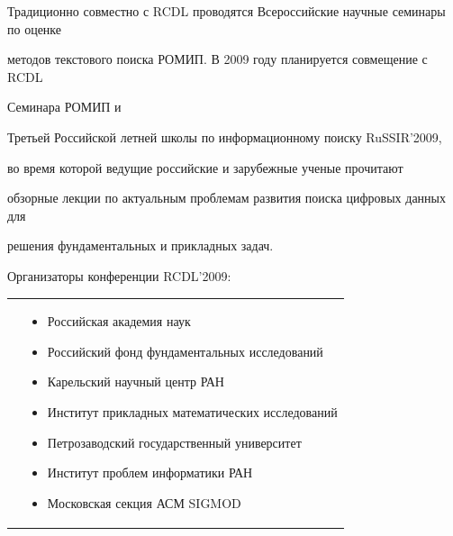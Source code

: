 \documentclass[10pt]{book}
\begin{document}
Традиционно совместно с RCDL проводятся Всероссийские научные семинары по оценке


методов текстового поиска РОМИП. В 2009 году планируется совмещение с RCDL


Семинара РОМИП и\linebreak


 Третьей Российской летней школы по информационному поиску RuSSIR'2009,


во время которой ведущие российские и зарубежные ученые прочитают


обзорные лекции по актуальным проблемам развития поиска цифровых данных для


решения фундаментальных и прикладных задач.


\vspace*{6pt}





Организаторы конференции RCDL'2009:


\vspace*{-6pt}





\noindent


\begin{tabular}{p{7mm}p{420pt}}


\hspace*{7mm}&


\begin{itemize}


\item Российская академия наук


\item Российский фонд фундаментальных исследований


\item Карельский научный центр РАН


\item Институт прикладных математических исследований


\item Петрозаводский государственный университет


\item Институт проблем информатики РАН


\item Московская секция АСМ SIGMOD


\end{itemize}


\end{tabular}





\end{document}
